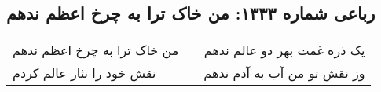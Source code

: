 \begin{center}
\section*{رباعی شماره ۱۳۳۳: من خاک ترا به چرخ اعظم ندهم}
\label{sec:1333}
\begin{longtable}{l p{0.5cm} r}
من خاک ترا به چرخ اعظم ندهم
&&
یک ذره غمت بهر دو عالم ندهم
\\
نقش خود را نثار عالم کردم
&&
وز نقش تو من آب به آدم ندهم
\\
\end{longtable}
\end{center}
